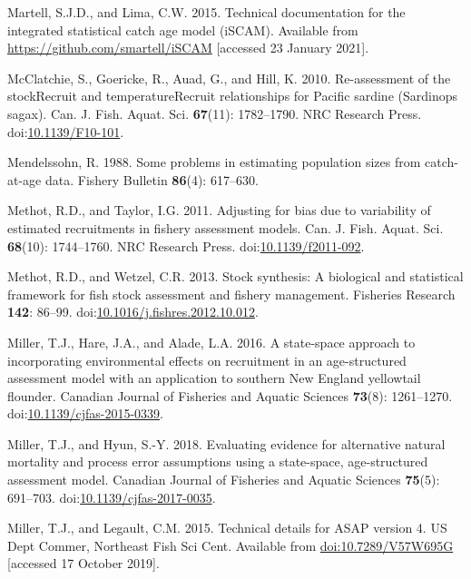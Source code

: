 \documentclass[]{article}
\begin{document}
\leavevmode\hypertarget{ref-martell2015Technical}{}%
Martell, S.J.D., and Lima, C.W. 2015. Technical documentation for the
integrated statistical catch age model (iSCAM). Available from
\url{https://github.com/smartell/iSCAM} {[}accessed 23 January 2021{]}.

\leavevmode\hypertarget{ref-mcclatchie2010Reassessment}{}%
McClatchie, S., Goericke, R., Auad, G., and Hill, K. 2010. Re-assessment
of the stockRecruit and temperatureRecruit relationships for Pacific
sardine (Sardinops sagax). Can. J. Fish. Aquat. Sci. \textbf{67}(11):
1782--1790. NRC Research Press.
doi:\href{https://doi.org/10.1139/F10-101}{10.1139/F10-101}.

\leavevmode\hypertarget{ref-mendelssohn1988Problems}{}%
Mendelssohn, R. 1988. Some problems in estimating population sizes from
catch-at-age data. Fishery Bulletin \textbf{86}(4): 617--630.

\leavevmode\hypertarget{ref-methot2011Adjusting}{}%
Methot, R.D., and Taylor, I.G. 2011. Adjusting for bias due to
variability of estimated recruitments in fishery assessment models. Can.
J. Fish. Aquat. Sci. \textbf{68}(10): 1744--1760. NRC Research Press.
doi:\href{https://doi.org/10.1139/f2011-092}{10.1139/f2011-092}.

\leavevmode\hypertarget{ref-methot2013Stock}{}%
Methot, R.D., and Wetzel, C.R. 2013. Stock synthesis: A biological and
statistical framework for fish stock assessment and fishery management.
Fisheries Research \textbf{142}: 86--99.
doi:\href{https://doi.org/10.1016/j.fishres.2012.10.012}{10.1016/j.fishres.2012.10.012}.

\leavevmode\hypertarget{ref-miller2016Statespace}{}%
Miller, T.J., Hare, J.A., and Alade, L.A. 2016. A state-space approach
to incorporating environmental effects on recruitment in an
age-structured assessment model with an application to southern New
England yellowtail flounder. Canadian Journal of Fisheries and Aquatic
Sciences \textbf{73}(8): 1261--1270.
doi:\href{https://doi.org/10.1139/cjfas-2015-0339}{10.1139/cjfas-2015-0339}.

\leavevmode\hypertarget{ref-miller2018Evaluating}{}%
Miller, T.J., and Hyun, S.-Y. 2018. Evaluating evidence for alternative
natural mortality and process error assumptions using a state-space,
age-structured assessment model. Canadian Journal of Fisheries and
Aquatic Sciences \textbf{75}(5): 691--703.
doi:\href{https://doi.org/10.1139/cjfas-2017-0035}{10.1139/cjfas-2017-0035}.

\leavevmode\hypertarget{ref-miller2015Technical}{}%
Miller, T.J., and Legault, C.M. 2015. Technical details for ASAP version
4. US Dept Commer, Northeast Fish Sci Cent. Available from
\url{doi:10.7289/V57W695G} {[}accessed 17 October 2019{]}.
\end{document}
